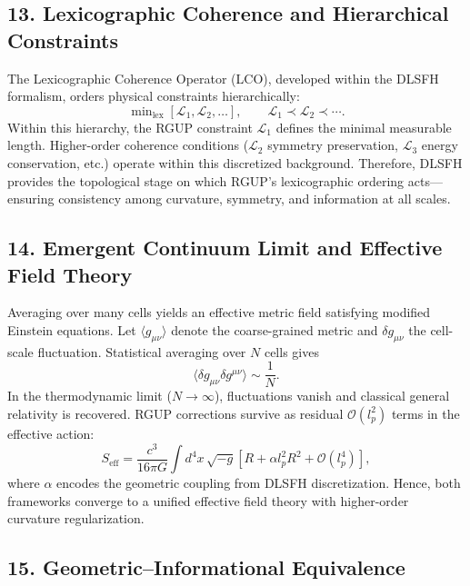 \documentclass[11pt,oneside]{book}
\numberwithin{equation}{chapter}
\begin{document}
\subsection*{13. Lexicographic Coherence and Hierarchical Constraints}

The Lexicographic Coherence Operator (LCO), developed within the DLSFH formalism, orders physical constraints hierarchically:
\begin{equation}
\min\nolimits_{\text{lex}}[\mathcal{L}_1,\mathcal{L}_2,\ldots],
\qquad
\mathcal{L}_1\prec\mathcal{L}_2\prec\cdots.
\end{equation}
Within this hierarchy, the RGUP constraint $\mathcal{L}_1$ defines the minimal measurable length.  
Higher-order coherence conditions ($\mathcal{L}_2$ symmetry preservation, $\mathcal{L}_3$ energy conservation, etc.) operate within this discretized background.  
Therefore, DLSFH provides the topological stage on which RGUP’s lexicographic ordering acts—ensuring consistency among curvature, symmetry, and information at all scales.

\subsection*{14. Emergent Continuum Limit and Effective Field Theory}

Averaging over many cells yields an effective metric field satisfying modified Einstein equations.  
Let $\langle g_{\mu\nu}\rangle$ denote the coarse-grained metric and $\delta g_{\mu\nu}$ the cell-scale fluctuation.  
Statistical averaging over $N$ cells gives
\begin{equation}
\langle \delta g_{\mu\nu}\delta g^{\mu\nu}\rangle
\sim \frac{1}{N}.
\end{equation}
In the thermodynamic limit ($N\!\to\!\infty$), fluctuations vanish and classical general relativity is recovered.  
RGUP corrections survive as residual $\mathcal{O}(l_p^2)$ terms in the effective action:
\begin{equation}
S_{\text{eff}} =
\frac{c^3}{16\pi G}\int d^4x\,\sqrt{-g}
\left[R + \alpha l_p^2 R^2 + \mathcal{O}(l_p^4)\right],
\end{equation}
where $\alpha$ encodes the geometric coupling from DLSFH discretization.  
Hence, both frameworks converge to a unified effective field theory with higher-order curvature regularization.

\subsection*{15. Geometric–Informational Equivalence}
\end{document}
